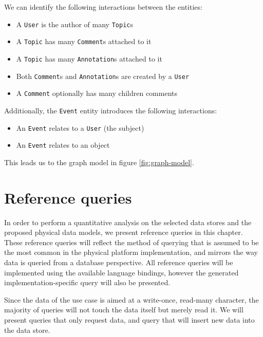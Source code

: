 We can identify the following interactions between the entities:

\begin{itemize}
  \item A \texttt{User} is the author of many \texttt{Topic}s
  \item A \texttt{Topic} has many \texttt{Comment}s attached to it
  \item A \texttt{Topic} has many \texttt{Annotation}s attached to it
  \item Both \texttt{Comment}s and \texttt{Annotation}s are created by a \texttt{User}
  \item A \texttt{Comment} optionally has many children comments
\end{itemize}

Additionally, the \texttt{Event} entity introduces the following interactions:

\begin{itemize}
  \item An \texttt{Event} relates to a \texttt{User} (the subject)
  \item An \texttt{Event} relates to an object
\end{itemize}

This leads us to the graph model in figure \ref{fig:graph-model}.

\section{Reference queries}
\label{sec:reference-queries}


In order to perform a quantitative analysis on the selected data stores and the proposed physical data models, we present  reference queries in this chapter.
These reference queries will reflect the method of querying that is assumed to be the most common in the physical platform implementation, and mirrors the way data is queried from a database perspective.
All reference queries will be implemented using the available language bindings, however the generated implementation-specific query will also be presented.

Since the data of the use case is aimed at a write-once, read-many character, the majority of queries will not touch the data itself but merely read it.
We will present  queries that only request data, and  query that will insert new data into the data store.

